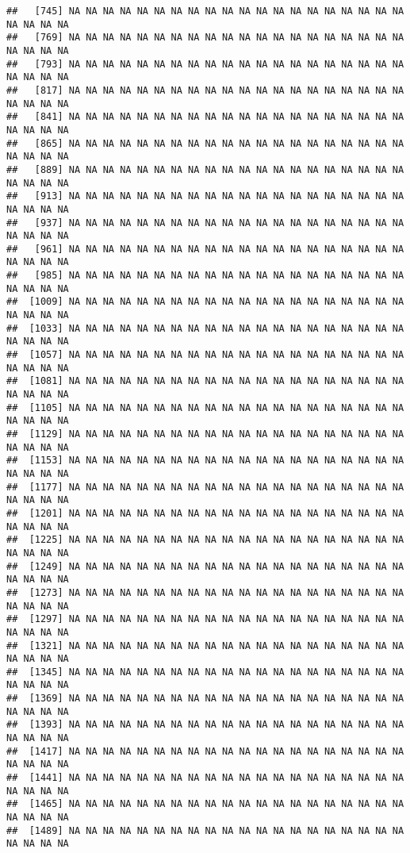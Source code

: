 \documentclass[
]{article}
\begin{document}
\begin{verbatim}
##   [745] NA NA NA NA NA NA NA NA NA NA NA NA NA NA NA NA NA NA NA NA NA NA NA NA
##   [769] NA NA NA NA NA NA NA NA NA NA NA NA NA NA NA NA NA NA NA NA NA NA NA NA
##   [793] NA NA NA NA NA NA NA NA NA NA NA NA NA NA NA NA NA NA NA NA NA NA NA NA
##   [817] NA NA NA NA NA NA NA NA NA NA NA NA NA NA NA NA NA NA NA NA NA NA NA NA
##   [841] NA NA NA NA NA NA NA NA NA NA NA NA NA NA NA NA NA NA NA NA NA NA NA NA
##   [865] NA NA NA NA NA NA NA NA NA NA NA NA NA NA NA NA NA NA NA NA NA NA NA NA
##   [889] NA NA NA NA NA NA NA NA NA NA NA NA NA NA NA NA NA NA NA NA NA NA NA NA
##   [913] NA NA NA NA NA NA NA NA NA NA NA NA NA NA NA NA NA NA NA NA NA NA NA NA
##   [937] NA NA NA NA NA NA NA NA NA NA NA NA NA NA NA NA NA NA NA NA NA NA NA NA
##   [961] NA NA NA NA NA NA NA NA NA NA NA NA NA NA NA NA NA NA NA NA NA NA NA NA
##   [985] NA NA NA NA NA NA NA NA NA NA NA NA NA NA NA NA NA NA NA NA NA NA NA NA
##  [1009] NA NA NA NA NA NA NA NA NA NA NA NA NA NA NA NA NA NA NA NA NA NA NA NA
##  [1033] NA NA NA NA NA NA NA NA NA NA NA NA NA NA NA NA NA NA NA NA NA NA NA NA
##  [1057] NA NA NA NA NA NA NA NA NA NA NA NA NA NA NA NA NA NA NA NA NA NA NA NA
##  [1081] NA NA NA NA NA NA NA NA NA NA NA NA NA NA NA NA NA NA NA NA NA NA NA NA
##  [1105] NA NA NA NA NA NA NA NA NA NA NA NA NA NA NA NA NA NA NA NA NA NA NA NA
##  [1129] NA NA NA NA NA NA NA NA NA NA NA NA NA NA NA NA NA NA NA NA NA NA NA NA
##  [1153] NA NA NA NA NA NA NA NA NA NA NA NA NA NA NA NA NA NA NA NA NA NA NA NA
##  [1177] NA NA NA NA NA NA NA NA NA NA NA NA NA NA NA NA NA NA NA NA NA NA NA NA
##  [1201] NA NA NA NA NA NA NA NA NA NA NA NA NA NA NA NA NA NA NA NA NA NA NA NA
##  [1225] NA NA NA NA NA NA NA NA NA NA NA NA NA NA NA NA NA NA NA NA NA NA NA NA
##  [1249] NA NA NA NA NA NA NA NA NA NA NA NA NA NA NA NA NA NA NA NA NA NA NA NA
##  [1273] NA NA NA NA NA NA NA NA NA NA NA NA NA NA NA NA NA NA NA NA NA NA NA NA
##  [1297] NA NA NA NA NA NA NA NA NA NA NA NA NA NA NA NA NA NA NA NA NA NA NA NA
##  [1321] NA NA NA NA NA NA NA NA NA NA NA NA NA NA NA NA NA NA NA NA NA NA NA NA
##  [1345] NA NA NA NA NA NA NA NA NA NA NA NA NA NA NA NA NA NA NA NA NA NA NA NA
##  [1369] NA NA NA NA NA NA NA NA NA NA NA NA NA NA NA NA NA NA NA NA NA NA NA NA
##  [1393] NA NA NA NA NA NA NA NA NA NA NA NA NA NA NA NA NA NA NA NA NA NA NA NA
##  [1417] NA NA NA NA NA NA NA NA NA NA NA NA NA NA NA NA NA NA NA NA NA NA NA NA
##  [1441] NA NA NA NA NA NA NA NA NA NA NA NA NA NA NA NA NA NA NA NA NA NA NA NA
##  [1465] NA NA NA NA NA NA NA NA NA NA NA NA NA NA NA NA NA NA NA NA NA NA NA NA
##  [1489] NA NA NA NA NA NA NA NA NA NA NA NA NA NA NA NA NA NA NA NA NA NA NA NA

\end{verbatim}
\end{document}
